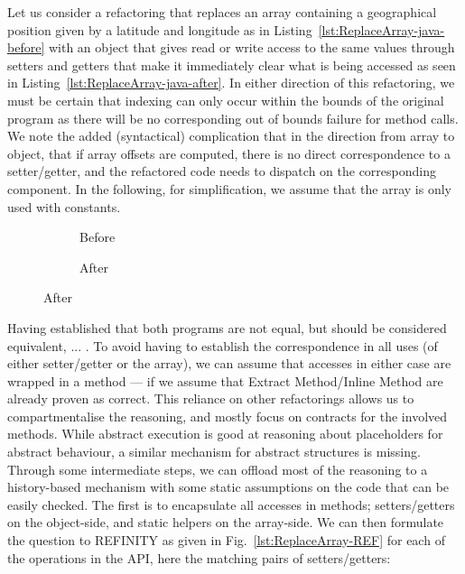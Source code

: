 Let us consider a refactoring that replaces an array containing a geographical position given by a latitude and longitude as in Listing~\ref{lst:ReplaceArray-java-before} with an object that gives read or write access to the same values through setters and getters that make it immediately clear what is being accessed as seen in Listing~\ref{lst:ReplaceArray-java-after}.
In either direction of this refactoring, we must be certain that indexing can only occur within the bounds of the original program as there will be no corresponding out of bounds failure for method calls.
We note the added (syntactical) complication that in the direction from array to object, that if array offsets are computed, there is no direct correspondence to a setter/getter,
and the refactored code needs to dispatch on the corresponding component.
In the following, for simplification, we assume that the array is only used with constants.



\begin{figure}
  \begin{subfigure}[h]{.45\linewidth} 
    
    \caption{Before}
    \label{refa:ReplaceArray-java-before}   
  \end{subfigure}\hspace{1cm}
  \begin{subfigure}[h]{.45\linewidth}
    
    \caption{After}
    \label{refa:ReplaceArray-java-after}
  \end{subfigure}
  \label{refa:ReplaceArray-java}
\end{figure}

Having established that both programs are not equal, but should be considered equivalent, ... .
To avoid having to establish the correspondence in all uses (of either setter/getter or the array),
we can assume that accesses in either case are wrapped in a method --- if we assume that Extract Method/Inline Method are already proven as correct.
This reliance on other refactorings allows us to compartmentalise the reasoning, and mostly focus on contracts for the involved methods.
While abstract execution is good at reasoning about placeholders for abstract behaviour, a similar mechanism for abstract structures is missing.
Through some intermediate steps, we can offload most of the reasoning to a history-based mechanism with some static assumptions on the code that can be easily checked.
The first is to encapsulate all accesses in methods; setters/getters on the object-side, and static helpers on the array-side.
We can then formulate the question to REFINITY as given in Fig.~\ref{lst:ReplaceArray-REF} for each of the operations in the API, here the matching pairs of setters/getters:

